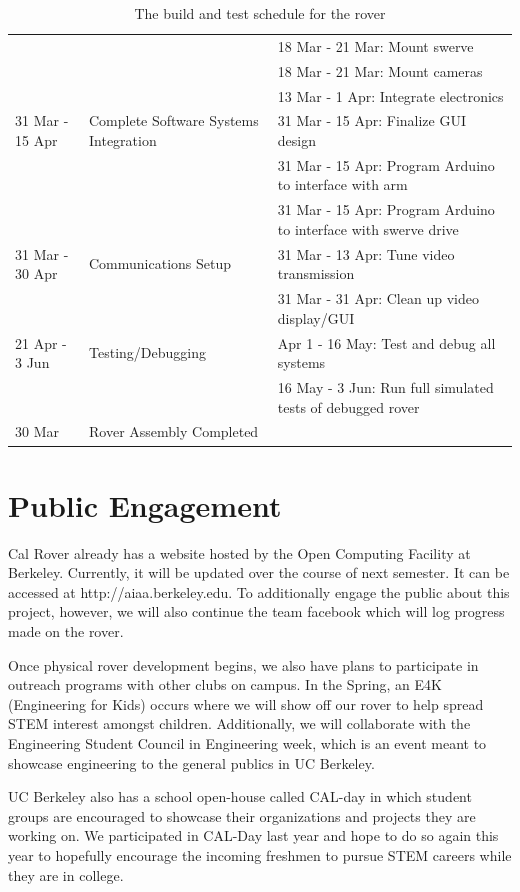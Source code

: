 \documentclass[titlepage,twocolumn,10pt]{article}
\begin{document}
\begin{table}[P]
\begin{tabular*}{\textwidth}{l  l  l}
            & & 18 Mar - 21 Mar: Mount swerve\\
            & & 18 Mar - 21 Mar: Mount cameras\\
            & & 13 Mar - 1 Apr: Integrate electronics\\
            \hline
            31 Mar - 15 Apr & Complete Software Systems Integration & 31 Mar - 15 Apr: Finalize GUI design \\
            & & 31 Mar - 15 Apr: Program Arduino to interface with arm\\
            & & 31 Mar - 15 Apr: Program Arduino to interface with swerve drive\\
            \hline
            31 Mar - 30 Apr & Communications Setup & 31 Mar - 13 Apr: Tune video transmission \\
            & & 31 Mar - 31 Apr: Clean up video display/GUI \\
            \hline
            21 Apr - 3 Jun & Testing/Debugging & Apr 1 - 16 May: Test and debug all systems \\
            & & 16 May - 3 Jun: Run full simulated tests of debugged rover\\
            \hline
            30 Mar & Rover Assembly Completed &  \\
        \end{tabular*}
        \caption{The build and test schedule for the rover}
    \end{table}

    \section{Public Engagement}
    Cal Rover already has a website hosted by the Open Computing Facility at Berkeley. Currently, it will be updated over the course of next semester. It can be accessed at http://aiaa.berkeley.edu. To additionally engage the public about this project, however, we will also continue the team facebook which will log progress made on the rover.

    Once physical rover development begins, we also have plans to participate in outreach programs with other clubs on campus. In the Spring, an E4K (Engineering for Kids)  occurs where we will show off our rover to help spread STEM interest amongst children. Additionally, we will collaborate with the Engineering Student Council in Engineering week, which is an event meant to showcase engineering to the general publics in UC Berkeley.

    UC Berkeley also has a school open-house called CAL-day in which student groups are encouraged to showcase their organizations and projects they are working on. We participated in CAL-Day last year and hope to do so again this year to hopefully encourage the incoming freshmen to pursue STEM careers while they are in college.
\end{document}
